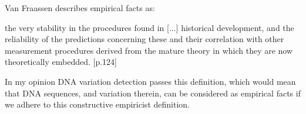Van Fraassen describes empirical facts as: \newline

\hfill\begin{minipage}{\dimexpr\textwidth-1cm}
the very stability in the procedures found in [...] historical development, and the reliability of the predictions concerning these and their correlation with other measurement procedures derived from the mature theory in which they are now theoretically embedded. [p.124]
\end{minipage} \newline \newline

\noindent In my opinion DNA variation detection passes this definition, which would mean that DNA sequences, and variation therein, can be considered as empirical facts if we adhere to this constructive empiricist definition. 
 




